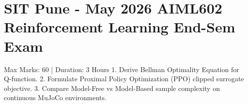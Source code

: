 \documentclass[12pt]{article}
\begin{document}
\section*{SIT Pune - May 2026 AIML602 Reinforcement Learning End-Sem Exam}
Max Marks: 60 | Duration: 3 Hours
1. Derive Bellman Optimality Equation for Q-function.
2. Formulate Proximal Policy Optimization (PPO) clipped surrogate objective.
3. Compare Model-Free vs Model-Based sample complexity on continuous MuJoCo environments.
\end{document}
